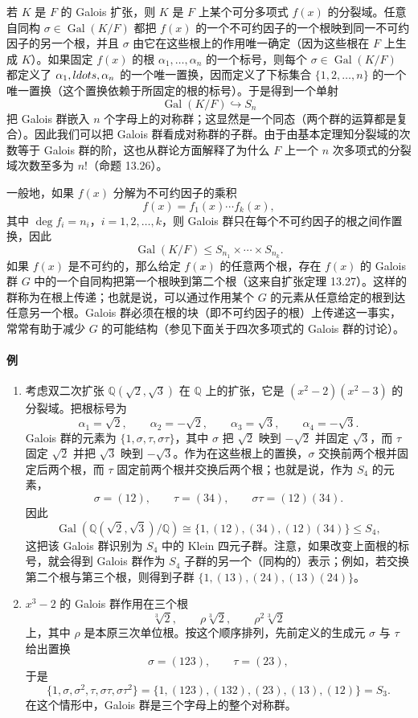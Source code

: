 若 $K$ 是 $F$ 的 Galois 扩张，则 $K$ 是 $F$ 上某个可分多项式 $f(x)$ 的分裂域。任意自同构 $\sigma\in \operatorname{Gal}(K/F)$ 都把 $f(x)$ 的一个不可约因子的一个根映到同一不可约因子的另一个根，并且 $\sigma$ 由它在这些根上的作用唯一确定（因为这些根在 $F$ 上生成 $K$）。如果固定 $f(x)$ 的根 $\alpha_1,\ldots,\alpha_n$ 的一个标号，则每个 $\sigma\in\operatorname{Gal}(K/F)$ 都定义了 $\alpha_1,\\ldots,\alpha_n$ 的一个唯一置换，因而定义了下标集合 $\{1,2,\ldots,n\}$ 的一个唯一置换（这个置换依赖于所固定的根的标号）。于是得到一个单射
\[
\operatorname{Gal}(K/F)\hookrightarrow S_n
\]
把 Galois 群嵌入 $n$ 个字母上的对称群；这显然是一个同态（两个群的运算都是复合）。因此我们可以把 Galois 群看成对称群的子群。由于由基本定理知分裂域的次数等于 Galois 群的阶，这也从群论方面解释了为什么 $F$ 上一个 $n$ 次多项式的分裂域次数至多为 $n!$（命题 13.26）。

一般地，如果 $f(x)$ 分解为不可约因子的乘积
\[
f(x)=f_1(x)\cdots f_k(x),
\]
其中 $\deg f_i=n_i$，$i=1,2,\ldots,k$，则 Galois 群只在每个不可约因子的根之间作置换，因此
\[
\operatorname{Gal}(K/F)\leq S_{n_1}\times\cdots\times S_{n_k}.
\]
如果 $f(x)$ 是不可约的，那么给定 $f(x)$ 的任意两个根，存在 $f(x)$ 的 Galois 群 $G$ 中的一个自同构把第一个根映到第二个根（这来自扩张定理 13.27）。这样的群称为在根上传递；也就是说，可以通过作用某个 $G$ 的元素从任意给定的根到达任意另一个根。Galois 群必须在根的块（即不可约因子的根）上传递这一事实，常常有助于减少 $G$ 的可能结构（参见下面关于四次多项式的 Galois 群的讨论）。

\paragraph{例}
\begin{enumerate}[label=(\arabic*)]
\item 考虑双二次扩张 $\mathbb Q(\sqrt2,\sqrt3)$ 在 $\mathbb Q$ 上的扩张，它是 $(x^2-2)(x^2-3)$ 的分裂域。把根标号为
\[
\alpha_1=\sqrt2,\qquad \alpha_2=-\sqrt2,\qquad \alpha_3=\sqrt3,
\qquad \alpha_4=-\sqrt3.
\]
Galois 群的元素为 $\{1,\sigma,\tau,\sigma\tau\}$，其中 $\sigma$ 把 $\sqrt2$ 映到 $-\sqrt2$ 并固定 $\sqrt3$，而 $\tau$ 固定 $\sqrt2$ 并把 $\sqrt3$ 映到 $-\sqrt3$。作为在这些根上的置换，$\sigma$ 交换前两个根并固定后两个根，而 $\tau$ 固定前两个根并交换后两个根；也就是说，作为 $S_4$ 的元素，
\[
\sigma=(12),\qquad \tau=(34),\qquad \sigma\tau=(12)(34).
\]
因此
\[
\operatorname{Gal}(\mathbb Q(\sqrt2,\sqrt3)/\mathbb Q)
\cong \{1,(12),(34),(12)(34)\}\leq S_4,
\]
这把该 Galois 群识别为 $S_4$ 中的 Klein 四元子群。注意，如果改变上面根的标号，就会得到 Galois 群作为 $S_4$ 子群的另一个（同构的）表示；例如，若交换第二个根与第三个根，则得到子群 $\{1,(13),(24),(13)(24)\}$。

\item $x^3-2$ 的 Galois 群作用在三个根
\[
\sqrt[3]{2},\qquad \rho\sqrt[3]{2},\qquad \rho^2\sqrt[3]{2}
\]
上，其中 $\rho$ 是本原三次单位根。按这个顺序排列，先前定义的生成元 $\sigma$ 与 $\tau$ 给出置换
\[
\sigma=(123),\qquad \tau=(23),
\]
于是
\[
\{1,\sigma,\sigma^2,\tau,\sigma\tau,\sigma\tau^2\}
=\{1,(123),(132),(23),(13),(12)\}=S_3.
\]
在这个情形中，Galois 群是三个字母上的整个对称群。
\end{enumerate}

